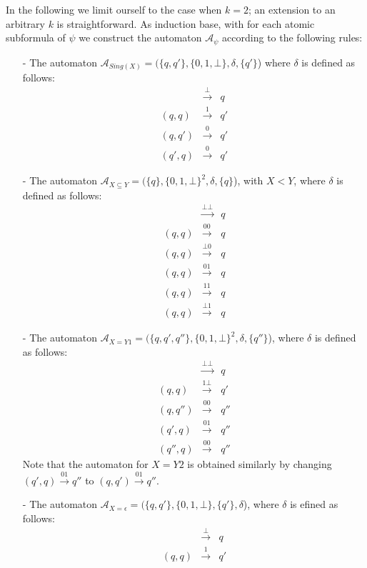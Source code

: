 In the following we limit ourself to the case when $k = 2$; an extension to an
arbitrary $k$ is straightforward. As induction base, with for each atomic
subformula of $\psi$ we construct the automaton $\mathcal{A}_{\psi}$ according
to the following rules:
\begin{itemize}
 \item[-] The automaton $\mathcal{A}_{Sing(X)} = (\{q, q'\}, \{0, 1, \bot\},
 \delta, \{q'\}$) where $\delta$ is defined as follows:
\begin{eqnarray*}
  & \overset{\bot}{\longrightarrow} & q\\
 (q, q) & \overset{1}{\longrightarrow} & q'\\
 (q, q') & \overset{0}{\longrightarrow} & q'\\
 (q', q) & \overset{0}{\longrightarrow} & q'
\end{eqnarray*}
 \item[-] The automaton $\mathcal{A}_{X \subseteq Y} = (\{q\}, \{0, 1, \bot\}^2,
 \delta, \{q\}$), with $X < Y$, where $\delta$ is defined as follows:
\begin{eqnarray*}
  & \overset{\bot\bot}{\longrightarrow} & q\\
  (q, q) & \overset{00}{\longrightarrow} & q\\
  (q, q) & \overset{\bot 0}{\longrightarrow} & q\\
  (q, q) & \overset{01}{\longrightarrow} & q\\
  (q, q) & \overset{11}{\longrightarrow} & q\\
  (q, q) & \overset{\bot 1}{\longrightarrow} & q
\end{eqnarray*}
 \item[-] The automaton $\mathcal{A}_{X = Y1} = (\{q, q', q''\}, \{0, 1,
 \bot\}^2, \delta, \{q''\}$), where $\delta$ is defined as follows:
\begin{eqnarray*}
  & \overset{\bot\bot}{\longrightarrow} & q\\
  (q, q) & \overset{1\bot}{\longrightarrow} & q'\\
  (q, q'') & \overset{00}{\longrightarrow} & q''\\
  (q', q) & \overset{01}{\longrightarrow} & q''\\
  (q'', q) & \overset{00}{\longrightarrow} & q''
\end{eqnarray*}
Note that the automaton for $X = Y2$ is obtained similarly by changing $(q', q)
\overset{01}{\longrightarrow} q''$ to $(q, q') \overset{01}{\longrightarrow}
 q''$.
 \item[-] The automaton $\mathcal{A}_{X = \epsilon} = (\{q, q'\}, \{0, 1,
 \bot\}, \{q'\}, \delta$), where $\delta$ is efined as follows:
\begin{eqnarray*}
  & \overset{\bot}{\longrightarrow} & q\\
 (q, q) & \overset{1}{\longrightarrow}& q'
\end{eqnarray*}
\end{itemize}

